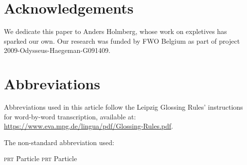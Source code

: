 \documentclass[output=paper]{LSP/langsci}
\begin{document}
\section*{Acknowledgements}
We dedicate this paper to Anders Holmberg, whose work on  expletives has sparked our own. Our research was funded by FWO Belgium as part of project 2009-Odysseus-Haegeman-G091409.

\section*{Abbreviations}
Abbreviations used in this article follow the Leipzig Glossing Rules’ instructions for word-by-word transcription, available at: \url{https://www.eva.mpg.de/lingua/pdf/Glossing-Rules.pdf}.

The non-standard abbreviation used:
\begin{tabbing}
\textsc{prt} \= Particle \kill
\textsc{prt} \> Particle
\end{tabbing}

\sloppy
\printbibliography[heading=subbibliography,notkeyword=this]
\end{document}
